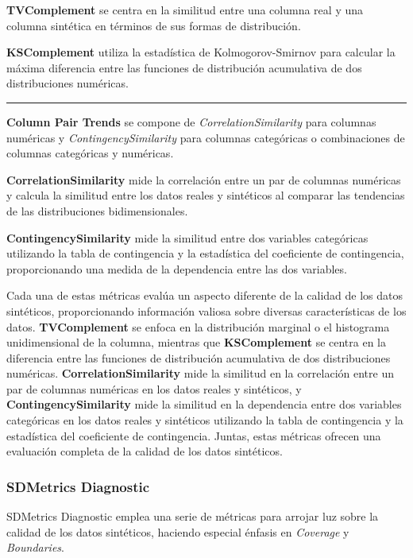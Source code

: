 \textbf{TVComplement} se centra en la similitud entre una columna real y una columna sintética en términos de sus formas de distribución.

\textbf{KSComplement} utiliza la estadística de Kolmogorov-Smirnov para calcular la máxima diferencia entre las funciones de distribución acumulativa de dos distribuciones numéricas. 

\rule{\textwidth}{0.5pt} 

\textbf{Column Pair Trends} se compone de \emph{CorrelationSimilarity} para columnas numéricas y \emph{ContingencySimilarity} para columnas categóricas o combinaciones de columnas categóricas y numéricas.

\textbf{CorrelationSimilarity} mide la correlación entre un par de columnas numéricas y calcula la similitud entre los datos reales y sintéticos al comparar las tendencias de las distribuciones bidimensionales. 

\textbf{ContingencySimilarity} mide la similitud entre dos variables categóricas utilizando la tabla de contingencia y la estadística del coeficiente de contingencia, proporcionando una medida de la dependencia entre las dos variables.

Cada una de estas métricas evalúa un aspecto diferente de la calidad de los datos sintéticos, proporcionando información valiosa sobre diversas características de los datos. \textbf{TVComplement} se enfoca en la distribución marginal o el histograma unidimensional de la columna, mientras que \textbf{KSComplement} se centra en la diferencia entre las funciones de distribución acumulativa de dos distribuciones numéricas. \textbf{CorrelationSimilarity} mide la similitud en la correlación entre un par de columnas numéricas en los datos reales y sintéticos, y \textbf{ContingencySimilarity} mide la similitud en la dependencia entre dos variables categóricas en los datos reales y sintéticos utilizando la tabla de contingencia y la estadística del coeficiente de contingencia. Juntas, estas métricas ofrecen una evaluación completa de la calidad de los datos sintéticos.

\subsubsection{SDMetrics Diagnostic}

SDMetrics Diagnostic emplea una serie de métricas para arrojar luz sobre la calidad de los datos sintéticos, haciendo especial énfasis en \emph{Coverage} y \emph{Boundaries}.

